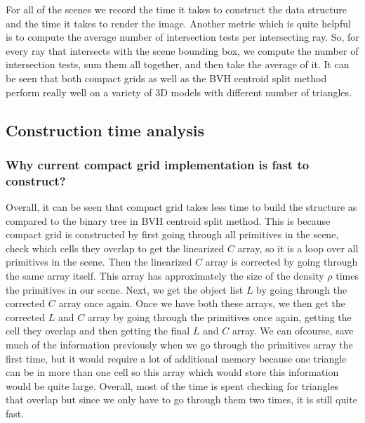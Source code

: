 \documentclass[11pt,a4paper]{article}
\begin{document}
For all of the scenes we record the time it takes to construct the data structure and the time it takes to render the image. Another metric which is quite helpful is to compute the average number of intersection tests per intersecting ray. So, for every ray that intersects with the scene bounding box, we compute the number of intersection tests, sum them all together, and then take the average of it. It can be seen that both compact grids as well as the BVH centroid split method perform really well on a variety of 3D models with different number of triangles. 

\subsection{Construction time analysis}
\subsubsection{Why current compact grid implementation is fast to construct?}
Overall, it can be seen that compact grid takes less time to build the structure as compared to the binary tree in BVH centroid split method. This is because compact grid is constructed by first going through all primitives in the scene, check which cells they overlap to get the linearized $C$ array, so it is a loop over all primitives in the scene. Then the linearized $C$ array is corrected by going through the same array itself. This array has approximately the size of the density $\rho$ times the primitives in our scene. Next, we get the object list $L$ by going through the corrected $C$ array once again. Once we have both these arrays, we then get the corrected $L$ and $C$ array by going through the primitives once again, getting the cell they overlap and then getting the final $L$ and $C$ array. We can ofcourse, save much of the information previously when we go through the primitives array the first time, but it would require a lot of additional memory because one triangle can be in more than one cell so this array which would store this information would be quite large. Overall, most of the time is spent checking for triangles that overlap but since we only have to go through them two times, it is still quite fast.
\end{document}
